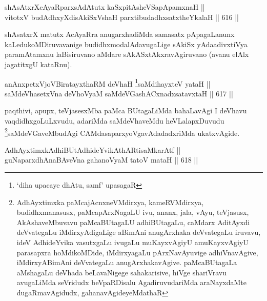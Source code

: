 
\begin{shl}
shAsAtxrXcAyaRparxsAdAtutx kaSxpitAsheVSapApamxnaH || \\
vitotxV budAdhxyXdisAkiSxVshaH parxtibudadhxsatxtheYkalaH \hfill || 616 ||  
\end{shl}

\begin{artha}
shAsatxrX matutx AcAyaRra anugarxhadiMda samasatx pApagaLanunx kaLedukoMDiruvavanige budidhxmodalAdavugaLige sAkiSx yAda\break adivxtiVya paramAtamxnu laBisiruvano aMdare sAkASxtAkxravAgiruvano (avanu elAlx jagatitxgU kataRnu).
\end{artha} 


\begin{shl}
anAnxpetxVjoVBiratayxthaRM deVhaH \footnote{`diha upacaye dhAtu, samf' upasagaR}saMdihayxteV yataH || \\
saMdeVhasetxVna deVhoV\s yaM saMdeVGashACxnadxsatavxtaH \hfill || 617 ||  
\end{shl}

\begin{artha}
paqthivi, apupx, teVjasesxMba paMca BUtagaLiMda bahaLavAgi
I deVhavu vaqdidhxgoLuLxvudu, adariMda saMdeVhaveMdu
heVLalapxDuvudu \footnote{AdhAyxtimxka paMcajAcnxneVMdirxya,
kameRVMdirxya, budidhxmanasusx, paMcapArxNagaLU ivu, ananx, jala,
vAyu, teVjasusx, AkAshaveMbuvavu paMcaBUtagaLU adhiBUtagaLu, caMdarx
AditAyxdi deVvategaLu iMdirxyAdigaLige aBimAni anugArxhaka
deVvategaLu iruvavu, ideV AdhideYvika vasutxgaLu ivugaLu
muKayxvAgiyU amuKayxvAgiyU parasapxra hoMdikoMDide, iMdirxyagaLu
pArxNavAyuvige adhiVnavAgive, iMdirxyABimAni deVvategaLu
anugArxhakavAgive. paMcaBUtagaLa aMshagaLu deVhada beLavaNigege
sahakarisive, hiVge shariVravu avugaLiMda seVridudx beVpaRDisalu
AgadiruvudariMda araNayxdaMte dugaRmavAgidudx, gahanavAgideyeMdathaR}saMdeVGaveMbudAgi CAMdasaparxyoVgavAdadadxriMda ukatxvAgide.
\end{artha}


\begin{shl}
AdhAyxtimxkAdhiBUtAdhideYvikAthARtisaMkarAtf || \\
guNaparxdhAnaBAveVna gahanoV\s yaM tatoV mataH \hfill || 618 ||  
\end{shl}

